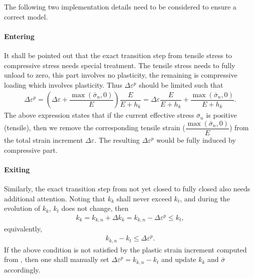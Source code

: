 The following two implementation details need to be considered to ensure a correct model.
\paragraph{Entering}
It shall be pointed out that the exact transition step from tensile stress to compressive stress needs special treatment. The tensile stress needs to fully unload to zero, this part involves no plasticity, the remaining is compressive loading which involves plasticity. Thus $\Delta\varepsilon^p$ should be limited such that
\begin{gather}\label{eq:k4_closing_strain}
\Delta\varepsilon^p=\left(\Delta\varepsilon+\dfrac{\max\left(\bar\sigma_n,0\right)}{E}\right)\dfrac{E}{E+h_k}=\Delta\varepsilon\dfrac{E}{E+h_k}+\dfrac{\max\left(\bar\sigma_n,0\right)}{E+h_k}.
\end{gather}
The above expression states that if the current effective stress $\bar{\sigma}_n$ is positive (tensile), then we remove the corresponding tensile strain ($\dfrac{\max\left(\bar\sigma_n,0\right)}{E}$) from the total strain increment $\Delta\varepsilon$. The resulting $\Delta\varepsilon^p$ would be fully induced by compressive part.
\paragraph{Exiting}
Similarly, the exact transition step from not yet closed to fully closed also needs additional attention. Noting that $k_k$ shall never exceed $k_t$, and during the evolution of $k_k$, $k_t$ does not change, then
\begin{gather}
k_k=k_{k,n}+\Delta{}k_k=k_{k,n}-\Delta\varepsilon^p\leqslant{}k_t,
\end{gather}
equivalently,
\begin{gather}
k_{k,n}-k_t\leqslant{}\Delta\varepsilon^p.
\end{gather}
If the above condition is not satisfied by the plastic strain increment computed from , then one shall manually set $\Delta\varepsilon^p=k_{k,n}-k_t$ and update $k_k$ and $\bar{\sigma}$ accordingly.

